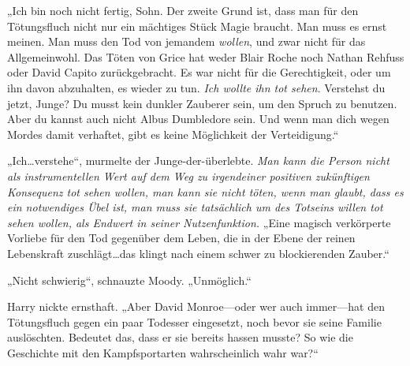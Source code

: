 „Ich bin noch nicht fertig, Sohn. Der zweite Grund ist, dass man für den Tötungsfluch nicht nur ein mächtiges Stück Magie braucht. Man muss es ernst meinen. Man muss den Tod von jemandem \emph{wollen}, und zwar nicht für das Allgemeinwohl. Das Töten von Grice hat weder Blair Roche noch Nathan Rehfuss oder David Capito zurückgebracht. Es war nicht für die Gerechtigkeit, oder um ihn davon abzuhalten, es wieder zu tun. \emph{Ich wollte ihn tot sehen}. Verstehst du jetzt, Junge? Du musst kein dunkler Zauberer sein, um den Spruch zu benutzen. Aber du kannst auch nicht Albus Dumbledore sein. Und wenn man dich wegen Mordes damit verhaftet, gibt es keine Möglichkeit der Verteidigung.“

„Ich…verstehe“, murmelte der Junge-der-überlebte.
\emph{Man kann die Person nicht als instrumentellen Wert auf dem Weg zu irgendeiner positiven zukünftigen Konsequenz tot sehen wollen, man kann sie nicht töten, wenn man glaubt, dass es ein notwendiges Übel ist, man muss sie tatsächlich um des Totseins willen tot sehen wollen, als Endwert in seiner Nutzenfunktion.}
„Eine magisch verkörperte Vorliebe für den Tod gegenüber dem Leben, die in der Ebene der reinen Lebenskraft zuschlägt…das klingt nach einem schwer zu blockierenden Zauber.“

„Nicht schwierig“, schnauzte Moody. „Unmöglich.“

Harry nickte ernsthaft.
„Aber David Monroe—oder wer auch immer—hat den Tötungsfluch gegen ein paar Todesser eingesetzt, noch bevor sie seine Familie auslöschten. Bedeutet das, dass er sie bereits hassen musste? So wie die Geschichte mit den Kampfsportarten wahrscheinlich wahr war?“

